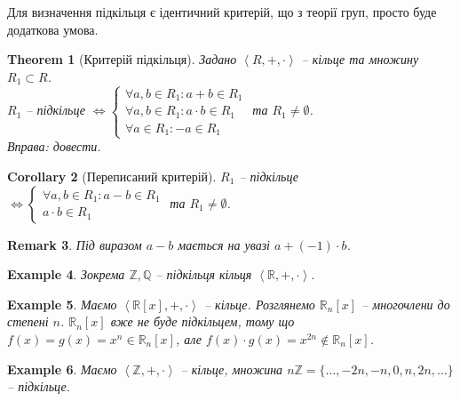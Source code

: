\documentclass[a4paper, 10pt]{article}
\theoremstyle{theoremdd}
\newtheorem{theorem}{Theorem}[subsection]
\theoremstyle{theoremdd}
\theoremstyle{theoremdd}
\theoremstyle{theoremdd}
\theoremstyle{theoremdd}
\newtheorem{example}[theorem]{Example}
\theoremstyle{theoremdd}
\theoremstyle{theoremdd}
\theoremstyle{theoremdd}
\theoremstyle{theoremdd}
\theoremstyle{theoremdd}
\theoremstyle{theoremdd}
\newtheorem{remark}[theorem]{Remark}
\theoremstyle{theoremdd}
\theoremstyle{theoremdd}
\theoremstyle{theoremdd}
\newtheorem{corollary}[theorem]{Corollary}
\theoremstyle{theoremdd}
\begin{document}
Для визначення підкільця є ідентичний критерій, що з теорії груп, просто буде додаткова умова.

\begin{theorem}[Критерій підкільця]
\label{subring_criterion}
Задано $\left<R,+, \cdot \right>$ -- кільце та множину $R_1 \subset R$.\\
$R_1$ -- підкільце $\iff \begin{cases} \forall a,b \in R_1: a+b \in R_1 \\ \forall a,b \in R_1: a \cdot b \in R_1 \\ \forall a \in R_1: -a \in R_1 \end{cases}$ та $R_1 \neq \emptyset$.\\
\textit{Вправа: довести.}
\end{theorem}

\begin{corollary}[Переписаний критерій]
$R_1$ -- підкільце $\iff \begin{cases} \forall a,b \in R_1: a-b \in R_1 \\ a \cdot b \in R_1 \end{cases}$ та $R_1 \neq \emptyset$.
\end{corollary}

\begin{remark}
Під виразом $a-b$ мається на увазі $a + (-1) \cdot b$.
\end{remark}

\begin{example}
Зокрема $\mathbb{Z}, \mathbb{Q}$ -- підкільця кільця $\left< \mathbb{R},+,\cdot \right>$.
\end{example}

\begin{example}
Маємо $\left<\mathbb{R}[x], +, \cdot \right>$ -- кільце. \iffalse Розглянемо множину $\mathbb{R}[0] = \{f(x) \in \mathbb{R}[x]: f(0) = 0\}$ - многочлен без вільного члена. Тоді $\mathbb{R}[0]$ - підкільце - це легко показується.\\ \fi
Розглянемо $\mathbb{R}_n[x]$ -- многочлени до степені $n$. $\mathbb{R}_n[x]$ вже не буде підкільцем, тому що $f(x) = g(x) = x^n \in \mathbb{R}_n[x]$, але $f(x) \cdot g(x) = x^{2n} \not \in \mathbb{R}_n[x]$.
\end{example}

\begin{example}
Маємо $\left<\mathbb{Z},+,\cdot \right>$ -- кільце, множина $n\mathbb{Z} = \{\dots,-2n,-n,0,n,2n,\dots\}$ -- підкільце.
\end{example}
\end{document}
